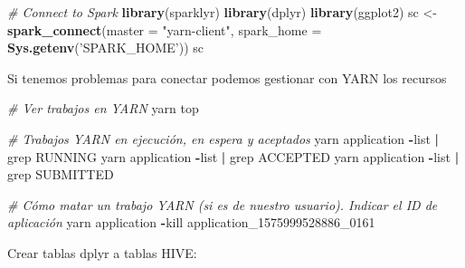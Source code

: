 \documentclass[]{book}
\newenvironment{Shaded}{\begin{snugshade}}{\end{snugshade}}
\newcommand{\KeywordTok}[1]{\textcolor[rgb]{0.13,0.29,0.53}{\textbf{#1}}}
\newcommand{\DataTypeTok}[1]{\textcolor[rgb]{0.13,0.29,0.53}{#1}}
\newcommand{\DecValTok}[1]{\textcolor[rgb]{0.00,0.00,0.81}{#1}}
\newcommand{\StringTok}[1]{\textcolor[rgb]{0.31,0.60,0.02}{#1}}
\newcommand{\CommentTok}[1]{\textcolor[rgb]{0.56,0.35,0.01}{\textit{#1}}}
\newcommand{\OtherTok}[1]{\textcolor[rgb]{0.56,0.35,0.01}{#1}}
\newcommand{\OperatorTok}[1]{\textcolor[rgb]{0.81,0.36,0.00}{\textbf{#1}}}
\newcommand{\NormalTok}[1]{#1}
\begin{document}
\begin{Shaded}
\begin{Highlighting}[]
\CommentTok{# Connect to Spark}
\KeywordTok{library}\NormalTok{(sparklyr)}
\KeywordTok{library}\NormalTok{(dplyr)}
\KeywordTok{library}\NormalTok{(ggplot2)}
\NormalTok{sc <-}\StringTok{ }\KeywordTok{spark_connect}\NormalTok{(}\DataTypeTok{master =} \StringTok{"yarn-client"}\NormalTok{, }\DataTypeTok{spark_home =} \KeywordTok{Sys.getenv}\NormalTok{(}\StringTok{'SPARK_HOME'}\NormalTok{)) }
\NormalTok{sc}
\end{Highlighting}
\end{Shaded}

Si tenemos problemas para conectar podemos gestionar con YARN los
recursos

\begin{Shaded}
\begin{Highlighting}[]
\CommentTok{# Ver trabajos en YARN}
\NormalTok{yarn top}

\CommentTok{# Trabajos YARN en ejecución, en espera y aceptados}
\NormalTok{yarn application }\OperatorTok{-}\NormalTok{list }\OperatorTok{|}\StringTok{ }\NormalTok{grep RUNNING}
\NormalTok{yarn application }\OperatorTok{-}\NormalTok{list }\OperatorTok{|}\StringTok{ }\NormalTok{grep ACCEPTED}
\NormalTok{yarn application }\OperatorTok{-}\NormalTok{list }\OperatorTok{|}\StringTok{ }\NormalTok{grep SUBMITTED}

\CommentTok{# Cómo matar un trabajo YARN (si es de nuestro usuario). Indicar el ID de aplicación}
\NormalTok{yarn application }\OperatorTok{-}\NormalTok{kill application_1575999528886_}\DecValTok{0161}
\end{Highlighting}
\end{Shaded}

Crear tablas dplyr a tablas HIVE:

\begin{Shaded}
\end{Shaded}

\begin{Shaded}
\end{Shaded}
\end{document}
